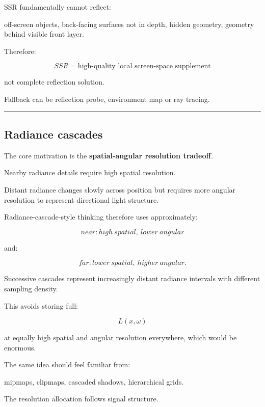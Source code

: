 \hypertarget{04-visual-computing-ii-ch040-missing-data}{}

SSR fundamentally cannot reflect:

off-screen objects, back-facing surfaces not in depth, hidden geometry, geometry behind visible front layer.

Therefore:

\[
\boxed{
SSR
=
\text{high-quality local screen-space supplement}
}
\]

not complete reflection solution.

Fallback can be reflection probe, environment map or ray tracing.

\begin{center}\rule{0.5\linewidth}{0.5pt}\end{center}

\subsection{Radiance cascades}\label{04-visual-computing-ii-ch040-radiance-cascades}

\hypertarget{04-visual-computing-ii-ch040-radiance-cascades}{}

The core motivation is the \textbf{spatial-angular resolution tradeoff}.

Nearby radiance details require high spatial resolution.

Distant radiance changes slowly across position but requires more angular resolution to represent directional light structure.

Radiance-cascade-style thinking therefore uses approximately:

\[
\boxed{
near:
high\ spatial,\ lower\ angular
}
\]

and:

\[
\boxed{
far:
lower\ spatial,\ higher\ angular.
}
\]

Successive cascades represent increasingly distant radiance intervals with different sampling density.

This avoids storing full:

\[
L(x,\omega)
\]

at equally high spatial and angular resolution everywhere, which would be enormous.

The same idea should feel familiar from:

mipmaps, clipmaps, cascaded shadows, hierarchical grids.

The resolution allocation follows signal structure.

